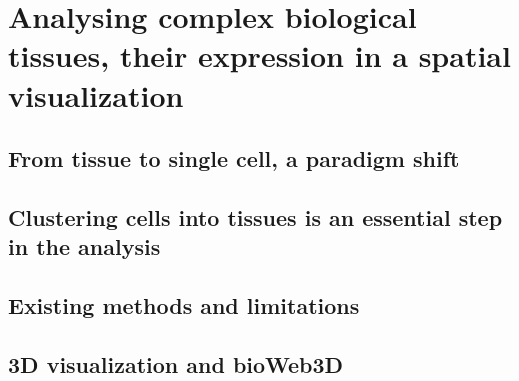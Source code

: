 \chapter{Analysing complex biological tissues, their expression in a spatial visualization}\label{ch:visualization}
\section{From tissue to single cell, a paradigm shift}
\section{Clustering cells into tissues is an essential step in the analysis}
\section{Existing methods and limitations}
\section{3D visualization and bioWeb3D}

